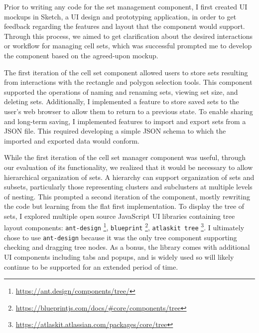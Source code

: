 \documentclass[12pt, letterpaper]{article}
\begin{document}
Prior to writing any code for the set management component, I first created UI mockups in Sketch, a UI design and prototyping application, in order to get feedback regarding the features and layout that the component would support.
Through this process, we aimed to get clarification about the desired interactions or workflow for managing cell sets, which was successful prompted me to develop the component based on the agreed-upon mockup.

The first iteration of the cell set component allowed users to store sets resulting from interactions with the rectangle and polygon selection tools.
This component supported the operations of naming and renaming sets, viewing set size, and deleting sets.
Additionally, I implemented a feature to store saved sets to the user's web browser to allow them to return to a previous state.
To enable sharing and long-term saving, I implemented features to import and export sets from a JSON file.
This required developing a simple JSON schema to which the imported and exported data would conform.

While the first iteration of the cell set manager component was useful, through our evaluation of its functionality, we realized that it would be necessary to allow hierarchical organization of sets.
A hierarchy can support organization of sets and subsets, particularly those representing clusters and subclusters at multiple levels of nesting.
This prompted a second iteration of the component, mostly rewriting the code but learning from the flat first implementation.
To display the tree of sets, I explored multiple open source JavaScript UI libraries containing tree layout components: \texttt{ant-design} \footnote{\url{https://ant.design/components/tree/}}, \texttt{blueprint} \footnote{\url{https://blueprintjs.com/docs/\#core/components/tree}}, \texttt{atlaskit tree} \footnote{\url{https://atlaskit.atlassian.com/packages/core/tree}}.
I ultimately chose to use \texttt{ant-design} because it was the only tree component supporting checking and dragging tree nodes.
As a bonus, the library comes with additional UI components including tabs and popups, and is widely used so will likely continue to be supported for an extended period of time.
\end{document}
